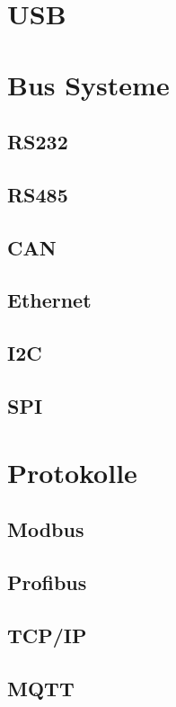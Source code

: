 \section{USB}

\section{Bus Systeme}

\subsection{RS232}

\subsection{RS485}

\subsection{CAN}

\subsection{Ethernet}

\subsection{I2C}

\subsection{SPI}

\section{Protokolle}

\subsection{Modbus}

\subsection{Profibus}

\subsection{TCP/IP}

\subsection{MQTT}